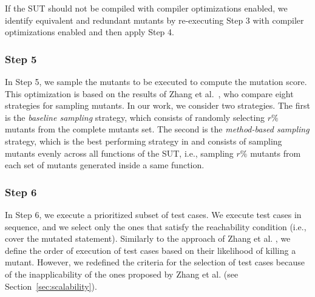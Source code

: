 If the SUT should not be compiled with compiler optimizations enabled, we identify equivalent and redundant mutants by re-executing Step 3 with compiler optimizations enabled and then apply Step 4.

\subsubsection{Step 5}

In Step 5, we sample the mutants to be executed to compute the mutation score. This optimization is based on the results of Zhang et al.~\cite{zhang2013operator}, who compare eight strategies for sampling mutants. In our work, we consider two strategies. The first is the \emph{baseline sampling} strategy, which consists of randomly selecting $r\%$ mutants from the complete mutants set. The second is the \emph{method-based sampling} strategy, which is the best performing strategy in \cite{zhang2013operator} and consists of sampling mutants evenly across all functions of the SUT, i.e., sampling $r\%$ mutants from each set of mutants generated inside a same function.



\subsubsection{Step 6}

In Step 6, we execute a prioritized subset of test cases. 
We execute test cases in sequence, and we select only the ones that satisfy 
the reachability condition (i.e., cover the mutated statement).
Similarly to the approach of Zhang et al. \cite{zhang2013faster}, we define the order of execution of test cases based on their likelihood of killing a mutant. However, we redefined the criteria for the selection of test cases because of the inapplicability of the ones proposed by Zhang et al. (see Section~\ref{sec:scalability}).




